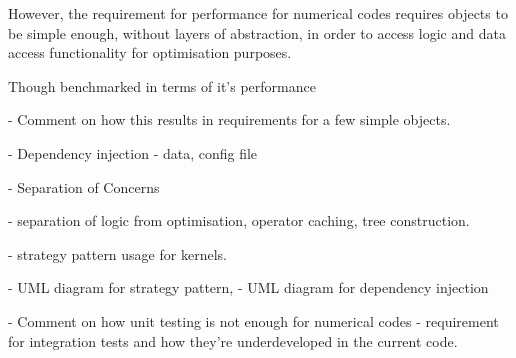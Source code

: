 However, the requirement for performance for numerical
codes requires objects to be simple enough, without layers of abstraction, in
order to access logic and data access functionality for optimisation purposes.

Though benchmarked in terms of it's performance

- Comment on how this results in requirements for a few simple objects.

- Dependency injection
    - data, config file

- Separation of Concerns

   - separation of logic from optimisation, operator caching,
       tree construction.

    - strategy pattern usage for kernels.

- UML diagram for strategy pattern,
- UML diagram for dependency injection

- Comment on how unit testing is not enough for numerical codes
    - requirement for integration tests and how they're underdeveloped in
    the current code.

